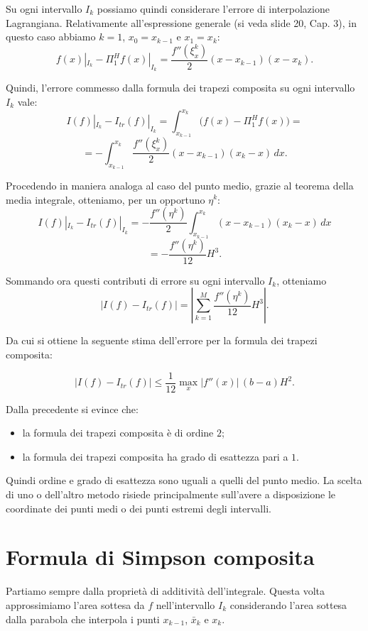 \documentclass[11pt,a4paper]{report}
\newcommand{\abs}[1]{\left\lvert #1 \right\rvert}
\begin{document}
Su ogni intervallo $I_k$ possiamo quindi considerare l'errore di interpolazione Lagrangiana. Relativamente all'espressione generale (si veda slide 20, Cap. 3), in questo caso abbiamo $k=1$, $x_0=x_{k-1}$ e $x_1=x_k$:
\[
 f(x)|_{I_k}-\Pi_1^H f(x)|_{I_k}=\frac{f''(\xi_x^k)}{2}(x-x_{k-1})(x-x_k).
\]


\begin{nonExamBox}
Quindi, l'errore commesso dalla formula dei trapezi composita su ogni intervallo $I_k$ vale:
\[
 I(f)|_{I_k}-I_{tr}(f)|_{I_k}=\int_{x_{k-1}}^{x_k}\big(f(x)-\Pi_1^H f(x)\big)=
\]
\[
=-\int_{x_{k-1}}^{x_k}\frac{f''(\xi_x^k)}{2}(x-x_{k-1})(x_k-x)\,dx.
\]

Procedendo in maniera analoga al caso del punto medio, grazie al teorema della media integrale, otteniamo, per un opportuno $\eta^k$:
\[
 I(f)|_{I_k}-I_{tr}(f)|_{I_k}=-\frac{f''(\eta^k)}{2}\int_{x_{k-1}}^{x_k}(x-x_{k-1})(x_k-x)\,dx
\]
\[
=-\frac{f''(\eta^k)}{12}H^3.
\]

Sommando ora questi contributi di errore su ogni intervallo $I_k$, otteniamo
\[
 \abs{I(f)-I_{tr}(f)}=\left|\sum_{k=1}^M \frac{f''(\eta^k)}{12}H^3\right|.
\]
\end{nonExamBox}

Da cui si ottiene la seguente stima dell'errore per la formula dei trapezi composita:
\begin{formulaBox}
\[
 \abs{I(f)-I_{tr}(f)}\le \frac{1}{12}\max_x \abs{f''(x)}\,(b-a)H^2.
\]
\end{formulaBox}

Dalla precedente si evince che:
\begin{itemize}
  \item la formula dei trapezi composita \`e di ordine $2$;
  \item la formula dei trapezi composita ha grado di esattezza pari a $1$.
\end{itemize}
Quindi ordine e grado di esattezza sono uguali a quelli del punto medio. La scelta di uno o dell'altro metodo risiede principalmente sull'avere a disposizione le coordinate dei punti medi o dei punti estremi degli intervalli.

\section{Formula di Simpson composita}
Partiamo sempre dalla propriet\`a di additivit\`a dell'integrale. Questa volta approssimiamo l'area sottesa da $f$ nell'intervallo $I_k$ considerando l'area sottesa dalla parabola che interpola i punti $x_{k-1}$, $\bar x_k$ e $x_k$.
\end{document}
